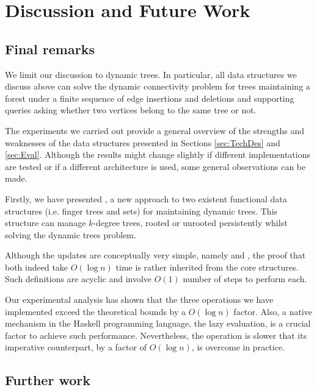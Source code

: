 \section{Discussion and Future Work} 
\label{sec:Concl} 
\label{sec:discussion}

\subsection{Final remarks}

We limit our discussion to dynamic trees. In particular, all data structures we discuss above can solve the dynamic connectivity problem for trees maintaining a forest under a finite sequence of edge insertions and deletions and supporting queries asking whether two vertices belong to the same tree or not.

The experiments we carried out provide a general overview of the strengths and weaknesses of the data structures presented in Sections \ref{sec:TechDes} and \ref{sec:Eval}. Although the results might change slightly if different implementations are tested or if a different architecture is used, some general observations can be made.

Firstly, we have presented \dyntset, a new approach to two existent functional data structures (i.e. finger trees and sets) for maintaining dynamic trees. This structure can manage $k$-degree trees, rooted or unrooted persistently whilst solving the dynamic trees problem. 

Although the updates are conceptually very simple, namely \link and \cut, the proof that both indeed take $O(\log n)$ time is rather inherited from the core structures. Such definitions are acyclic and involve $O(1)$ number of steps to perform each. 

Our experimental analysis has shown that the three operations we have implemented exceed the theoretical bounds by a $O(\log n)$ factor. Also, a native mechanism in the Haskell programming language, the lazy evaluation, is a crucial factor to achieve such performance. Nevertheless, the \link operation is slower that its imperative counterpart, by a factor of $O(\log n)$, is overcome in practice.

\subsection{Further work}


